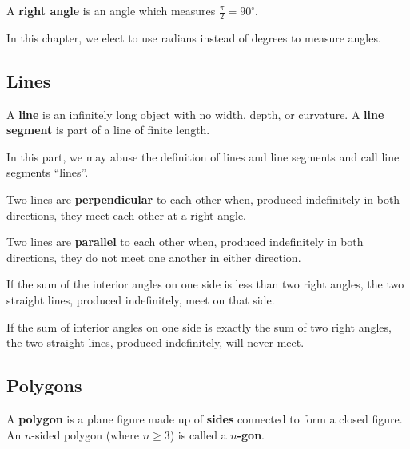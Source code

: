 \begin{definition}
    A \textbf{right angle} is an angle which measures $\frac\pi2 = 90^\circ$.
\end{definition}

In this chapter, we elect to use radians instead of degrees to measure angles.

\subsection{Lines}
\begin{definition}
    A \textbf{line} is an infinitely long object with no width, depth, or curvature. A \textbf{line segment} is part of a line of finite length.
\end{definition}

\begin{remark}
    In this part, we may abuse the definition of lines and line segments and call line segments ``lines''.
\end{remark}

\begin{definition}
    Two lines are \textbf{perpendicular} to each other when, produced indefinitely in both directions, they meet each other at a right angle.
\end{definition}

\begin{definition}
    Two lines are \textbf{parallel} to each other when, produced indefinitely in both directions, they do not meet one another in either direction.
\end{definition}

\begin{axiom}
    If the sum of the interior angles on one side is less than two right angles, the two straight lines, produced indefinitely, meet on that side.
\end{axiom}

\begin{proposition}
    If the sum of interior angles on one side is exactly the sum of two right angles, the two straight lines, produced indefinitely, will never meet.
\end{proposition}

\subsection{Polygons}
\begin{definition}
    A \textbf{polygon} is a plane figure made up of \textbf{sides} connected to form a closed figure. An $n$-sided polygon (where $n \geq 3$) is called a \textbf{$n$-gon}.
\end{definition}

